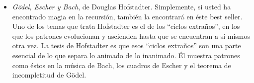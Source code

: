 \begin{itemize}
\item {\em G\"{o}del, Escher y Bach}, de Douglas Hofstadter.  Simplemente,
si usted ha encontrado magia en la recursión, también la encontrará en éste
best seller. Uno de los temas que trata Hofstadter es el de los 
 ``ciclos extraños'', en los que los patrones evolucionan y ascienden hasta
que se encuentran a sí mismos otra vez. La tesis de Hofstadter es que 
esos ``ciclos extraños'' son una parte esencial de lo que separa lo 
animado de lo inanimado. Él muestra patrones como éstos en la 
música de Bach, los cuadros de Escher y el teorema de incompletitud de
 Gödel.

\end{itemize}
